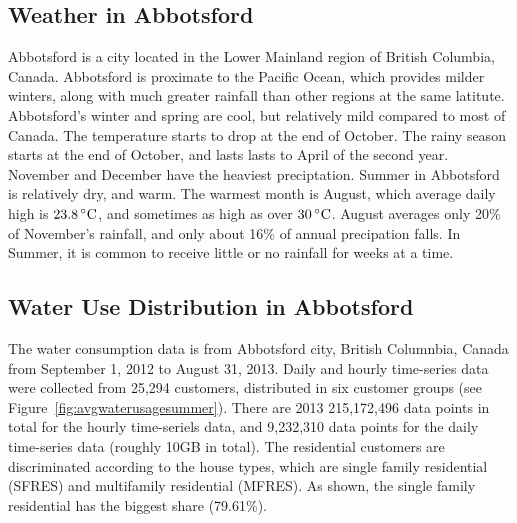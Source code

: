 \documentclass{sig-alternate}
\begin{document}
\subsection{Weather in Abbotsford}
Abbotsford is a city located in the Lower Mainland region of British Columbia, Canada. Abbotsford is proximate to the Pacific Ocean, which provides milder winters, along with much greater rainfall than other regions at the same latitute. Abbotsford's winter and spring are cool, but relatively mild compared to most of Canada.   
The temperature starts to drop at the end of October. The rainy season starts at the end of October, and lasts lasts to April of the second year. November and December have the heaviest preciptation.  Summer in Abbotsford is relatively dry, and warm. The warmest month is August, which average daily high is $23.8 \,^{\circ}{\rm C}$, and sometimes as high as over $30 \,^{\circ}{\rm C}$. August averages only 20\% of November's rainfall, and only about 16\% of annual precipation falls. In Summer, it is common to receive little or no rainfall for weeks at a time.


\subsection{Water Use Distribution in Abbotsford}
The water consumption data is from  Abbotsford  city, British Columnbia, Canada from September 1, 2012 to August 31, 2013. Daily and hourly time-series data were collected from 25,294 customers,  distributed in six customer groups (see Figure~\ref{fig:avgwaterusagesummer}). There are 2013 215,172,496 data points in total for the hourly time-seriels data, and 9,232,310 data points for the daily time-series data (roughly 10GB in total). The residential customers are discriminated according to the house types, which are single family residential (SFRES) and multifamily residential (MFRES). As shown, the single family residential has the biggest share (79.61\%).
\end{document}
